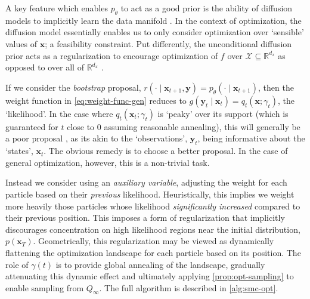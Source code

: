 \begin{remark}
    A key feature which enables $p_\theta$ to act as a good prior is the ability of diffusion models
    to implicitly learn the data manifold \parencite{debortoliDiffusionSchrOdinger2021,pidstrigachScoreBasedGenerativeModels2022,wenliangScorebasedGenerativeModels2023}.
    In the context of optimization, the diffusion model essentially enables us to only consider
    optimization over `sensible' values of $\mathbf{x}$; a feasibility constraint. Put differently,
    the unconditional diffusion prior acts as a regularization to encourage optimization of $f$ over
    $\mathcal{X} \subseteq \mathbb{R}^{d_x}$ as opposed to over all of $\mathbb{R}^{d_x}$
    \parencite{guoGradientGuidanceDiffusion2024}.
\end{remark}

If we consider the \emph{bootstrap} proposal,
$r(\cdot \mid \mathbf{x}_{t+1}, \mathbf{y}) = p_\theta(\cdot \mid \mathbf{x}_{t+1})$, then the
weight function in \autoref{eq:weight-func-gen} reduces to
$g(\mathbf{y}_t \mid \mathbf{x}_t) = q_t(\mathbf{x}; \gamma_t)$, the `likelihood'. In the case where
$q_t(\mathbf{x}_t; \gamma_t)$ is `peaky' over its support (which is guaranteed for $t$ close to 0
assuming reasonable annealing), this will generally be a poor proposal
\parencite{chopinIntroductionSequentialMonte2020}, as its akin to the `observations',
$\mathbf{y}_t$, being informative about the `states', $\mathbf{x}_t$. The obvious remedy is to
choose a better proposal. In the case of general optimization, however, this is a non-trivial task.

Instead we consider using an \emph{auxiliary variable}, adjusting the weight
for each particle based on their \emph{previous} likelihood. Heuristically, this implies we weight
more heavily those particles whose likelihood \emph{significantly increased} compared to their
previous position. This imposes a form of regularization that implicitly discourages concentration on
high likelihood regions near the initial distribution, $p(\mathbf{x}_T)$. Geometrically, this
regularization may be viewed as dynamically flattening the optimization landscape for each particle
based on its position. The role of $\gamma(t)$ is to provide global annealing of the landscape,
gradually attenuating this dynamic effect and ultimately applying \autoref{prop:opt-sampling} to
enable sampling from $Q_\infty$. The full algorithm is described in \autoref{alg:smc-opt}.

